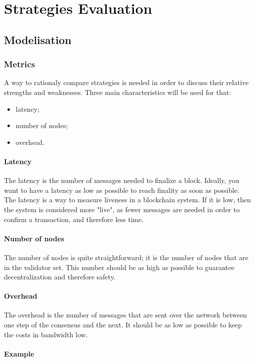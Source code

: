 \chapter{Strategies Evaluation}
\label{chap:strategies}

\section{Modelisation}
\subsection{Metrics}
A way to rationaly compare strategies is needed in order to discuss their
relative strengths and weaknesses. Three main characteristics will be used for
that:
\begin{itemize}
        \item latency;
        \item number of nodes;
        \item overhead.
\end{itemize}

\subsubsection{Latency}
The latency is the number of messages needed to finalize a block. Ideally, you
want to have a latency as low as possible to reach finality as soon as possible.
The latency is a way to measure liveness in a blockchain system. If it is low,
then the system is considered more "live", as fewer messages are needed in order
to confirm a transaction, and therefore less time.

\subsubsection{Number of nodes}
The number of nodes is quite straightforward; it is the number of nodes that are
in the validator set. This number should be as high as possible to guarantee
decentralization and therefore safety.

\subsubsection{Overhead}
The overhead is the number of messages that are sent over the network between
one step of the consensus and the next. It should be as low as possible to keep
the costs in bandwidth low.

\subsubsection{Example}

